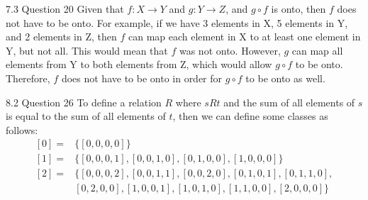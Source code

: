 \documentclass[12pt]{article}
\begin{document}
    \begin{problem}{7.3 Question 20}
        Given that $f: X \rightarrow Y$ and $g: Y \rightarrow Z$, and $g \circ f$ is onto, then $f$ does not have to be onto.
        For example, if we have 3 elements in X, 5 elements in Y, and 2 elements in Z, then $f$ can map each element in X to
        at least one element in Y, but not all. This would mean that $f$ was not onto. However, $g$ can map all elements from
        Y to both elements from Z, which would allow $g \circ f$ to be onto. Therefore, $f$ does not have to be onto in order
        for $g \circ f$ to be onto as well.
    \end{problem}

    \begin{problem}{8.2 Question 26}
        To define a relation $R$ where $sRt$ and the sum of all elements of $s$ is equal to the sum of all elements of $t$,
        then we can define some classes as follows:
        \begin{equation*}
            \begin{split}
                [0] = & \{[0, 0, 0, 0]\} \\
                [1] = & \{[0, 0, 0, 1], [0, 0, 1, 0], [0, 1, 0, 0], [1, 0, 0, 0]\} \\
                [2] = & \{[0, 0, 0, 2], [0, 0, 1, 1], [0, 0, 2, 0], [0, 1, 0, 1], [0, 1, 1, 0], \\ 
                      & [0, 2, 0, 0], [1, 0, 0, 1], [1, 0, 1, 0], [1, 1, 0, 0], [2, 0, 0, 0]\}
            \end{split}
        \end{equation*}
    \end{problem}
\end{document}
